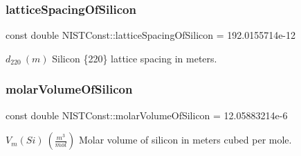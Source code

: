 \subsubsection{\texorpdfstring{lattice\+Spacing\+Of\+Silicon}{latticeSpacingOfSilicon}}
{\footnotesize\ttfamily const double N\+I\+S\+T\+Const\+::lattice\+Spacing\+Of\+Silicon = 192.\+0155714e-\/12}

$d_{220} \ (m)$ Silicon \{220\} lattice spacing in meters. \mbox{\label{group___silicon_gaf084f6d4668f778d204cd782269f082c}} 
\subsubsection{\texorpdfstring{molar\+Volume\+Of\+Silicon}{molarVolumeOfSilicon}}
{\footnotesize\ttfamily const double N\+I\+S\+T\+Const\+::molar\+Volume\+Of\+Silicon = 12.\+05883214e-\/6}

$V_m(Si) \ (\frac{m^3}{mol})$ Molar volume of silicon in meters cubed per mole. 